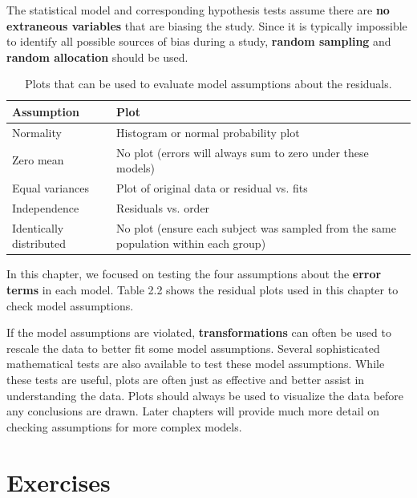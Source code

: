 \documentclass[
]{report}
\begin{document}
The statistical model and corresponding hypothesis tests assume there are \textbf{no extraneous variables} that are biasing the study. Since it is typically impossible to identify all possible sources of bias during a study, \textbf{random sampling} and \textbf{random allocation} should be used.

\begin{table}[!h]
\centering
\caption{\label{tab:tab3} Plots that can be used to evaluate model assumptions about the residuals.}
\centering
\begin{tabular}[t]{ll}
\toprule
Assumption & Plot\\
\midrule
Normality & Histogram or normal probability plot\\
Zero mean & No plot (errors will always sum to zero under these models)\\
Equal variances & Plot of original data or residual vs. fits\\
Independence & Residuals vs. order\\
Identically distributed & No plot (ensure each subject was sampled from the same population within each group)\\
\bottomrule
\end{tabular}
\end{table}

In this chapter, we focused on testing the four assumptions about the \textbf{error terms} in each model. Table 2.2 shows the residual plots used in this chapter to check model assumptions.

If the model assumptions are violated, \textbf{transformations} can often be used to rescale the data to better fit some model assumptions. Several sophisticated mathematical tests are also available to test these model assumptions. While these tests are useful, plots are often just as effective and better assist in understanding the data. Plots should always be used to visualize the data before any conclusions are drawn. Later chapters will provide much more detail on checking assumptions for more complex models.

\hypertarget{exercises-1}{%
\section*{Exercises}\label{exercises-1}}
\end{document}
